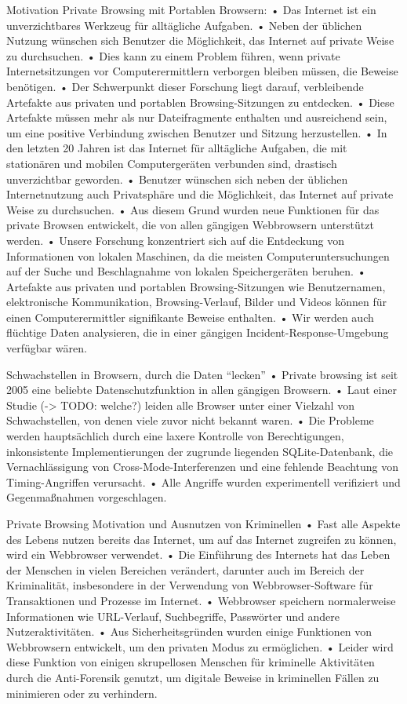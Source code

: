 Motivation Private Browsing mit Portablen Browsern: \cite{Ohana.2013}
	•	Das Internet ist ein unverzichtbares Werkzeug für alltägliche Aufgaben.
	•	Neben der üblichen Nutzung wünschen sich Benutzer die Möglichkeit, das Internet auf private Weise zu durchsuchen.
	•	Dies kann zu einem Problem führen, wenn private Internetsitzungen vor Computerermittlern verborgen bleiben müssen, die Beweise benötigen.
	•	Der Schwerpunkt dieser Forschung liegt darauf, verbleibende Artefakte aus privaten und portablen Browsing-Sitzungen zu entdecken.
	•	Diese Artefakte müssen mehr als nur Dateifragmente enthalten und ausreichend sein, um eine positive Verbindung zwischen Benutzer und Sitzung herzustellen.
	•	In den letzten 20 Jahren ist das Internet für alltägliche Aufgaben, die mit stationären und mobilen Computergeräten verbunden sind, drastisch unverzichtbar geworden.
	•	Benutzer wünschen sich neben der üblichen Internetnutzung auch Privatsphäre und die Möglichkeit, das Internet auf private Weise zu durchsuchen.
	•	Aus diesem Grund wurden neue Funktionen für das private Browsen entwickelt, die von allen gängigen Webbrowsern unterstützt werden.
	•	Unsere Forschung konzentriert sich auf die Entdeckung von Informationen von lokalen Maschinen, da die meisten Computeruntersuchungen auf der Suche und Beschlagnahme von lokalen Speichergeräten beruhen.
	•	Artefakte aus privaten und portablen Browsing-Sitzungen wie Benutzernamen, elektronische Kommunikation, Browsing-Verlauf, Bilder und Videos können für einen Computerermittler signifikante Beweise enthalten.
	•	Wir werden auch flüchtige Daten analysieren, die in einer gängigen Incident-Response-Umgebung verfügbar wären.


Schwachstellen in Browsern, durch die Daten “lecken” \cite{Satvat.2014}
	•	Private browsing ist seit 2005 eine beliebte Datenschutzfunktion in allen gängigen Browsern.
	•	Laut einer Studie (-> TODO: welche?) leiden alle Browser unter einer Vielzahl von Schwachstellen, von denen viele zuvor nicht bekannt waren.
	•	Die Probleme werden hauptsächlich durch eine laxere Kontrolle von Berechtigungen, inkonsistente Implementierungen der zugrunde liegenden SQLite-Datenbank, die Vernachlässigung von Cross-Mode-Interferenzen und eine fehlende Beachtung von Timing-Angriffen verursacht.
	•	Alle Angriffe wurden experimentell verifiziert und Gegenmaßnahmen vorgeschlagen.


Private Browsing Motivation und Ausnutzen von Kriminellen \cite{Rochmadi.2017}
	•	Fast alle Aspekte des Lebens nutzen bereits das Internet, um auf das Internet zugreifen zu können, wird ein Webbrowser verwendet.
	•	Die Einführung des Internets hat das Leben der Menschen in vielen Bereichen verändert, darunter auch im Bereich der Kriminalität, insbesondere in der Verwendung von Webbrowser-Software für Transaktionen und Prozesse im Internet.
	•	Webbrowser speichern normalerweise Informationen wie URL-Verlauf, Suchbegriffe, Passwörter und andere Nutzeraktivitäten.
	•	Aus Sicherheitsgründen wurden einige Funktionen von Webbrowsern entwickelt, um den privaten Modus zu ermöglichen.
	•	Leider wird diese Funktion von einigen skrupellosen Menschen für kriminelle Aktivitäten durch die Anti-Forensik genutzt, um digitale Beweise in kriminellen Fällen zu minimieren oder zu verhindern.


